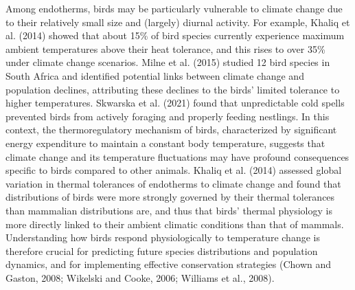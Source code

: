 \documentclass[10pt, twoside]{book} %
\begin{document}
	Among endotherms, birds may be particularly vulnerable to climate change due to their relatively small size and (largely) diurnal activity. For example, Khaliq et al. (2014) showed that about 15\% of bird species currently experience maximum ambient temperatures above their heat tolerance, and this rises to over 35\% under climate change scenarios. Milne et al. (2015) studied 12 bird species in South Africa and identified potential links between climate change and population declines, attributing these declines to the birds' limited tolerance to higher temperatures. Skwarska et al. (2021) found that unpredictable cold spells prevented birds from actively foraging and properly feeding nestlings. In this context, the thermoregulatory mechanism of birds, characterized by significant energy expenditure to maintain a constant body temperature, suggests that climate change and its temperature fluctuations may have profound consequences specific to birds compared to other animals. Khaliq et al. (2014) assessed global variation in thermal tolerances of endotherms to climate change and found that distributions of birds were more strongly governed by their thermal tolerances than mammalian distributions are, and thus that birds' thermal physiology is more directly linked to their ambient climatic conditions than that of mammals. Understanding how birds respond physiologically to temperature change is therefore crucial for predicting future species distributions and population dynamics, and for implementing effective conservation strategies (Chown and Gaston, 2008; Wikelski and Cooke, 2006; Williams et al., 2008). \\
\end{document}
